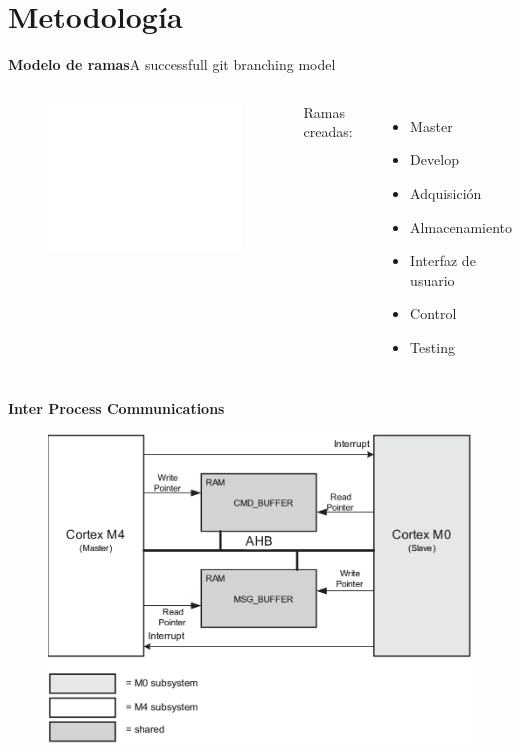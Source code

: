 \documentclass[11pt, xcolor={table,xcdraw}]{beamer}
\begin{document}
\section{Metodología}

\begin{frame}{\textbf{\LARGE{Modelo de ramas}}}{A successfull git branching model}
	\fontsize{16pt}{16}\selectfont
	\vspace{-.9cm}
	\begin{columns}
	  \begin{figure}[H]
    		\includegraphics<1->[height=.8\textheight]{./imagenes/Git-branching-model.pdf}
	  \end{figure}	
	\hfill
	Ramas creadas:
	\vspace{5px}
	  \begin{itemize}[]
		  \item Master
		  \item Develop
		  \item Adquisición
	  	  \item Almacenamiento
	  	  \item Interfaz de usuario
	 	  \item Control
	 	  \item Testing
	  \end{itemize}
	\end{columns}
\end{frame}


\begin{frame}{\textbf{\LARGE{Inter Process Communications}}}
	\vspace{-.7cm}
	\begin{figure}[H]
		\includegraphics[height=.8\textheight]{./imagenes/IPC.png}
	\end{figure}	
\end{frame}
\end{document}
